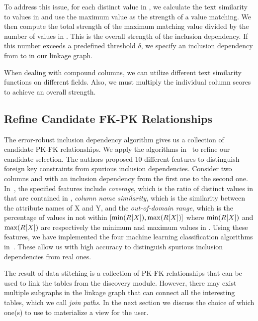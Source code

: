 To address this issue, for each distinct value in \RX, we calculate the text similarity to values in \SY and use the maximum value as the strength of a value matching. We then compute the total strength of the maximum matching value divided by the number of values in \RX. This is the overall strength of the inclusion dependency.  If this number exceeds a predefined threshold $\delta$, we specify an inclusion dependency from \RX to \SY in our linkage graph.

When dealing with compound columns, we can utilize different text similarity functions on different fields. Also, we must multiply the individual column scores to achieve an overall strength.


\subsection{Refine Candidate FK-PK Relationships}\label{subsec:refine}


The error-robust inclusion dependency algorithm gives us a collection of candidate PK-FK relationships.
We apply the algorithms in~\cite{DBLP:conf/webdb/RostinABNL09} to refine our candidate selection. The authors proposed 10 different features to distinguish foreign key constraints from spurious inclusion dependencies. Consider two columns \RX and \SY with an inclusion dependency from the first one to the second one. In~\cite{DBLP:conf/webdb/RostinABNL09}, the specified features include \emph{coverage}, which is the ratio of distinct values in \RX that are contained in \SY, \emph{column name similarity}, which is the similarity between the attribute names of X and Y, and the \emph{out-of-domain range}, which is the percentage of values in \SY not within $[\min(R[X]), \max(R[X])]$ where $\min(R[X])$ and $\max(R[X])$ are respectively the minimum and maximum values in \RX.
Using these features, we have implemented the four machine learning classification algorithms in~\cite{DBLP:conf/webdb/RostinABNL09}. These allow us with high accuracy to distinguish spurious inclusion dependencies from real ones.

The result of data stitching is a collection of PK-FK relationships that can be used to link the tables from the discovery module. However, there may exist multiple subgraphs in the linkage graph that can connect all the interesting tables, which we call \emph{join paths}. In the next section we discuss the choice of which one(s) to use to materialize a view for the user.


